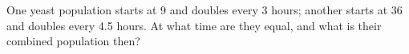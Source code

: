 One yeast population starts at 9 and doubles every 3 hours; another starts at 36 and doubles every 4.5 hours. At what time are they equal, and what is their combined population then?
